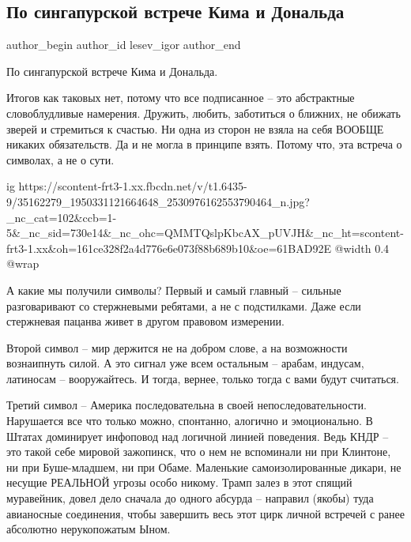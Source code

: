  
 
 
 
 
 
\subsection{По сингапурской встрече Кима и Дональда}
\label{sec:13_06_2018.fb.lesev_igor.1.singapur_vstrecha}
 
\ifcmt
 author_begin
   author_id lesev_igor
 author_end
\fi

По сингапурской встрече Кима и Дональда.

Итогов как таковых нет, потому что все подписанное – это абстрактные
словоблудливые намерения. Дружить, любить, заботиться о ближних, не обижать
зверей и стремиться к счастью. Ни одна из сторон не взяла на себя ВООБЩЕ
никаких обязательств. Да и не могла в принципе взять. Потому что, эта встреча о
символах, а не о сути.

\ifcmt
  ig https://scontent-frt3-1.xx.fbcdn.net/v/t1.6435-9/35162279_1950331121664648_2530976162553790464_n.jpg?_nc_cat=102&ccb=1-5&_nc_sid=730e14&_nc_ohc=QMMTQslpKbcAX_pUVJH&_nc_ht=scontent-frt3-1.xx&oh=161ce328f2a4d776e6e073f88b689b10&oe=61BAD92E
  @width 0.4
  @wrap 
\fi

А какие мы получили символы? Первый и самый главный – сильные разговаривают со
стержневыми ребятами, а не с подстилками. Даже если стержневая пацанва живет в
другом правовом измерении.

Второй символ – мир держится не на добром слове, а на возможности вознаипнуть
силой. А это сигнал уже всем остальным – арабам, индусам, латиносам –
вооружайтесь. И тогда, вернее, только тогда с вами будут считаться.

Третий символ – Америка последовательна в своей непоследовательности.
Нарушается все что только можно, спонтанно, алогично и эмоционально. В Штатах
доминирует инфоповод над логичной линией поведения. Ведь КНДР – это такой себе
мировой зажопинск, что о нем не вспоминали ни при Клинтоне, ни при
Буше-младшем, ни при Обаме. Маленькие самоизолированные дикари, не несущие
РЕАЛЬНОЙ угрозы особо никому. Трамп залез в этот спящий муравейник, довел дело
сначала до одного абсурда – направил (якобы) туда авианосные соединения, чтобы
завершить весь этот цирк личной встречей с ранее абсолютно нерукопожатым Ыном.

